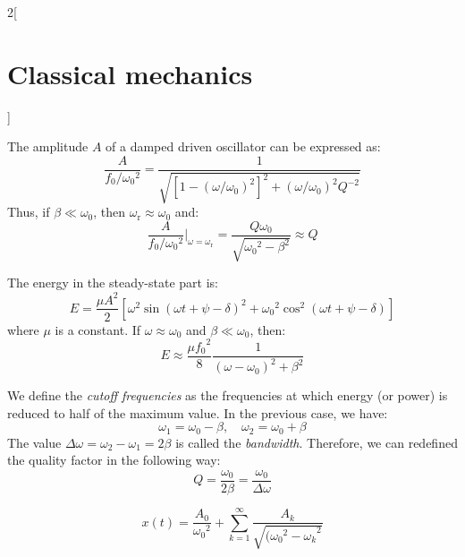 \documentclass[../../../main.tex]{subfiles}
\begin{document}
\begin{multicols}{2}[\section{Classical mechanics}]
\begin{proposition}
    The amplitude $A$ of a damped driven oscillator can be expressed as:
    $$\frac{A}{f_0/{\omega_0}^2}=\frac{1}{\sqrt{{\left[1-{\left(\omega/\omega_0\right)}^2\right]}^2+{\left(\omega/\omega_0\right)}^2Q^{-2}}}$$
    Thus, if $\beta\ll \omega_0$, then $\omega_\text{r}\approx\omega_0$ and: $$\frac{A}{f_0/{\omega_0}^2}\bigg|_{\omega=\omega_\text{r}}=\frac{Q\omega_0}{\sqrt{{\omega_0}^2-\beta^2}}\approx Q$$
    \begin{center}
      \begin{minipage}{\linewidth}
        \centering
        
      \end{minipage}
    \end{center}
  \end{proposition}
  \begin{proposition}
    The energy in the steady-state part is:
    $$E=\frac{\mu A^2}{2}\left[\omega^2{\sin(\omega t+\psi-\delta)}^2+{\omega_0}^2\cos^2(\omega t+\psi-\delta)\right]$$ where $\mu$ is a constant. If $\omega\approx\omega_0$ and $\beta\ll\omega_0$, then: $$E\approx\frac{\mu {f_0}^2}{8}\frac{1}{(\omega-\omega_0)^2+\beta^2}$$
  \end{proposition}
  \begin{definition}
    We define the \emph{cutoff frequencies} as the frequencies at which energy (or power) is reduced to half of the maximum value. In the previous case, we have: $$\omega_1=\omega_0-\beta,\quad\omega_2=\omega_0+\beta$$ The value  $\Delta\omega=\omega_2-\omega_1=2\beta$ is called the \emph{bandwidth}. Therefore, we can redefined the quality factor in the following way: $$Q=\frac{\omega_0}{2\beta}=\frac{\omega_0}{\Delta\omega}$$
  \end{definition}
  \begin{center}
    \begin{minipage}{\linewidth}
      \centering
      
    \end{minipage}
  \end{center}
  \begin{proposition}
    $$x(t)=\frac{A_0}{{\omega_0}^2}+\sum_{k=1}^\infty\frac{A_k}{\sqrt{{({\omega_0}^2-\omega_k}^2}}$$
  \end{proposition}
  \begin{proposition}

\end{proposition}
\end{multicols}
\end{document}
